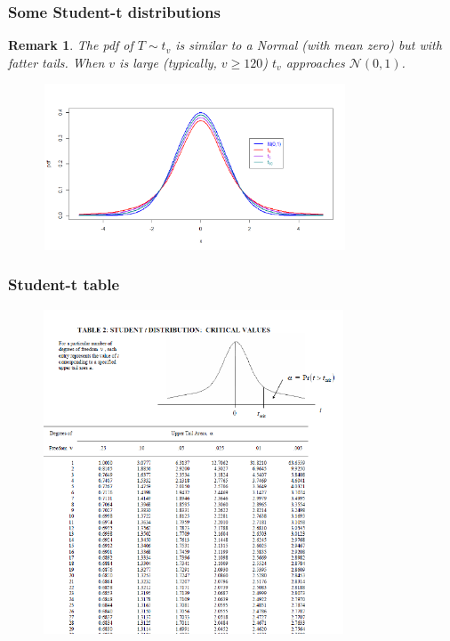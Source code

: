 \documentclass[notes=show,smaller,handout]{beamer}
\newtheorem{remark}{Remark}[section]
\newcommand{\N}{\mathcal{N}}
\begin{document}
\begin{frame}%

\frametitle{Some Student-t distributions}
\begin{remark}
The pdf of $T\sim t_{v}$ is similar to a Normal (with mean zero) but with fatter tails. When $v$ is large (typically, $v \geq 120$) $t_{v}$ approaches $\N(0,1)$.
\end{remark}

\begin{figure}[ptb]\centering
\includegraphics[height=1.9398in, width=3.5345in]{student_t__4.pdf}%
\end{figure}%


\end{frame}
\begin{frame}


\frametitle{Student-t table}

\begin{figure}[ptb]\centering
\includegraphics[height=3.8in, width=3.506in]{Student_t_table__5.pdf}%
\end{figure}

\end{frame}
\end{document}
